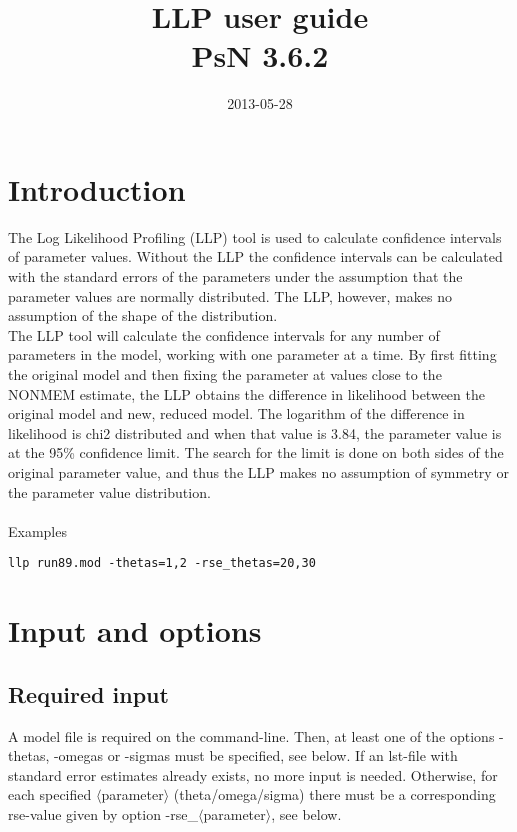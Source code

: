 \documentclass[a4paper,12pt]{article}
\title{LLP user guide\\ \vspace{2 mm} {\large PsN 3.6.2}}
\date{2013-05-28}
\begin{document}
\maketitle


\section{Introduction}
The Log Likelihood Profiling (LLP) tool is used to calculate confidence intervals of parameter values. Without the LLP the confidence intervals can be calculated with the standard errors of the parameters under the assumption that the parameter values are normally distributed. The LLP, however, makes no assumption of the shape of the distribution.
\\
The LLP tool will calculate the confidence intervals for any number of parameters in the model, working with one parameter at a time. By first fitting the original model and then fixing the parameter at values close to the NONMEM estimate, the LLP obtains the difference in likelihood between the original model and new, reduced model. The logarithm of the difference in likelihood is chi2 distributed and when that value is 3.84, the parameter value is at the 95\% confidence limit. The search for the limit is done on both sides of the original parameter value, and thus the LLP makes no assumption of symmetry or the parameter value distribution.
\\
\\
Examples
\begin{verbatim}
llp run89.mod -thetas=1,2 -rse_thetas=20,30
\end{verbatim}

\section{Input and options}

\subsection{Required input}
A model file is required on the command-line. Then, at least one of the options -thetas, -omegas or -sigmas must be specified, see below. If an lst-file with standard error estimates already exists, no more input is needed. Otherwise, for each specified $\langle$parameter$\rangle$ (theta/omega/sigma) there must be a corresponding rse-value given by option -rse\_$\langle$parameter$\rangle$, see below. 
\end{document}
